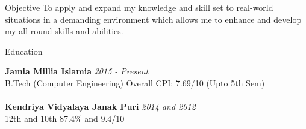 \documentclass{resume} %
\begin{document}


\begin{rSection}{Objective}
To apply and expand my knowledge and skill set to real-world situations in a demanding environment which allows me to enhance and develop my all-round skills and abilities.
\end{rSection}


\begin{rSection}{Education}

{\bf Jamia Millia Islamia} \hfill {\em 2015 - Present} 
\\ B.Tech (Computer Engineering) \hfill { Overall CPI: 7.69/10 (Upto 5th Sem)} 
\\
\\{\bf Kendriya Vidyalaya Janak Puri} \hfill {\em 2014 and 2012} \\
12th and 10th \hfill {87.4\% and 9.4/10}


\end{rSection}
\end{document}
